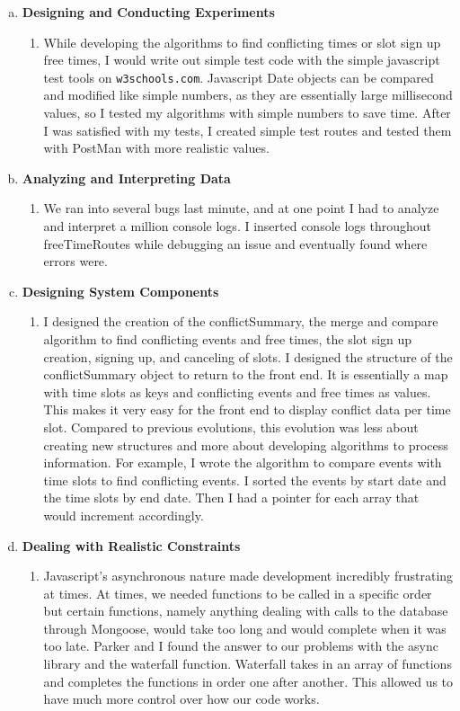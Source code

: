 \documentclass[11pt]{article}   %
\begin{document}
\begin{enumerate} [a)]
\item  {\bf Designing and Conducting Experiments}
\begin{enumerate} [$\cdot$]
\item While developing the algorithms to find conflicting times or slot sign up free times, I would write out simple test code with the simple javascript test tools on \texttt{w3schools.com}.  Javascript Date objects can be compared and modified like simple numbers, as they are essentially large millisecond values, so I tested my algorithms with simple numbers to save time.  After I was satisfied with my tests, I created simple test routes and tested them with PostMan with more realistic values.
\end{enumerate}
\item  {\bf Analyzing and Interpreting Data}
\begin{enumerate} [$\cdot$]
\item We ran into several bugs last minute, and at one point I had to analyze and interpret a million console logs.  I inserted console logs throughout freeTimeRoutes while debugging an issue and eventually found where errors were.
\end{enumerate}
\item {\bf Designing System Components}
\begin{enumerate} [$\cdot$]
\item I designed the creation of the conflictSummary, the merge and compare algorithm to find conflicting events and free times, the slot sign up creation, signing up, and canceling of slots.  I designed the structure of the conflictSummary object to return to the front end.  It is essentially a map with time slots as keys and conflicting events and free times as values.  This makes it very easy for the front end to display conflict data per time slot. Compared to previous evolutions, this evolution was less about creating new structures and more about developing algorithms to process information.  For example, I wrote the algorithm to compare events with time slots to find conflicting events.  I sorted the events by start date and the time slots by end date. Then I had a pointer for each array that would increment accordingly.
\end{enumerate}
\item {\bf Dealing with Realistic Constraints}
\begin{enumerate} [$\cdot$]
\item Javascript's asynchronous nature made development incredibly frustrating at times. At times, we needed functions to be called in a specific order but certain functions, namely anything dealing with calls to the database through Mongoose, would take too long and would complete when it was too late.  Parker and I found the answer to our problems with the async library and the waterfall function.  Waterfall takes in an array of functions and completes the functions in order one after another. This allowed us to have much more control over how our code works.

\end{enumerate}
\end{enumerate}
\end{document}
